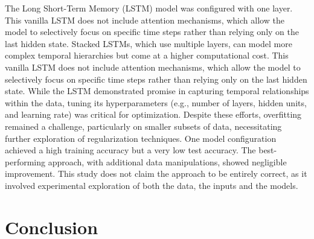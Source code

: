 \documentclass{article}
\begin{document}
The Long Short-Term Memory (LSTM) model was configured with one layer. This vanilla LSTM does not include attention mechanisms, which allow the model to selectively focus on specific time steps rather than relying only on the last hidden state. Stacked LSTMs, which use multiple layers, can model more complex temporal hierarchies but come at a higher computational cost. This vanilla LSTM does not include attention mechanisms, which allow the model to selectively focus on specific time steps rather than relying only on the last hidden state. While the LSTM demonstrated promise in capturing temporal relationships within the data, tuning its hyperparameters (e.g., number of layers, hidden units, and learning rate) was critical for optimization. Despite these efforts, overfitting remained a challenge, particularly on smaller subsets of data, necessitating further exploration of regularization techniques. One model configuration achieved a high training accuracy but a very low test accuracy. The best-performing approach, with additional data manipulations, showed negligible improvement. This study does not claim the approach to be entirely correct, as it involved experimental exploration of both the data, the inputs and the models.
\section{Conclusion}



\end{document}
